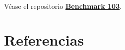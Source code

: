\documentclass[paper=a4, fontsize=11pt]{scrartcl} %
\numberwithin{equation}{section} %
\numberwithin{figure}{section} %
\numberwithin{table}{section} %
\begin{document}
\begin{enumerate}
		Véase el repositorio \href{https://github.com/oxcar103/Benchmark-103}{\textbf{Benchmark 103}}.
\end{enumerate}

\newpage
\section{Referencias}

\end{document}
